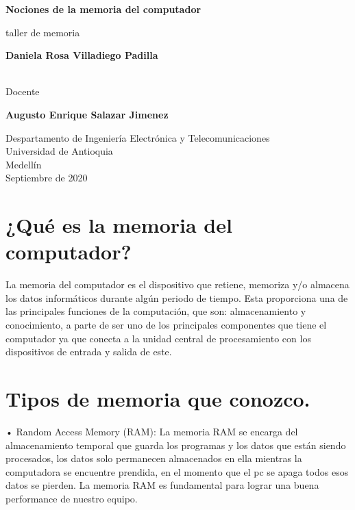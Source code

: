 \documentclass{article}
\begin{document}
\begin{titlepage}
    \begin{center}
        \vspace*{1cm}
            
        \Huge
        \textbf{Nociones de la memoria del computador}
            
        \vspace{0.5cm}
        \LARGE
        taller de memoria
            
        \vspace{1.5cm}
            
        \textbf{Daniela Rosa Villadiego Padilla}
         \newline  
         \vspace{3,5cm}
         
        \\Docente
         
        \newline
        \textbf{Augusto Enrique Salazar Jimenez}
        \vfill
            
        \vspace{0.8cm}
            
        \Large
        Despartamento de Ingeniería Electrónica y Telecomunicaciones\\
        Universidad de Antioquia\\
        Medellín\\
        Septiembre de 2020
            
    \end{center}
\end{titlepage}

\tableofcontents
\newpage
\section{¿Qué es la memoria del computador?} \label{contenido}
La memoria del computador es el dispositivo que retiene, memoriza y/o almacena los datos informáticos durante algún periodo de tiempo. Esta proporciona una de las principales funciones de la computación, que son: almacenamiento y conocimiento, a parte de ser uno de los principales componentes que tiene el computador ya que conecta a la unidad central de procesamiento con los dispositivos de entrada y salida de este. \cite{Wiki}
\section{Tipos de memoria que conozco.} \label{contenido}
•	Random Access Memory (RAM): La memoria RAM se encarga del almacenamiento temporal que guarda los programas y los datos que están siendo procesados, los datos solo permanecen almacenados en ella mientras la computadora se encuentre prendida, en el momento que el pc se apaga todos esos datos se pierden. La memoria RAM es fundamental para lograr una buena performance de nuestro equipo. 
\newline
\end{document}
